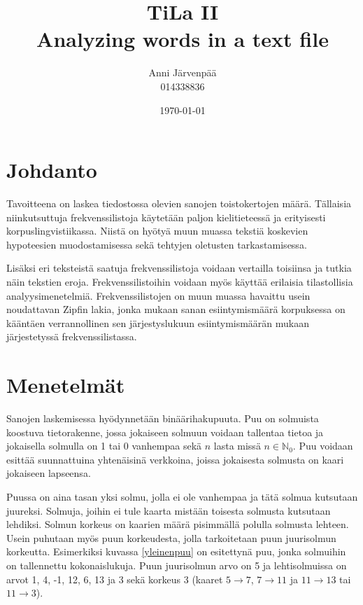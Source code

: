 \documentclass[12pt,a4paper,titlepage]{article}
\title{TiLa II \\ Analyzing words in a text file \vspace{0.5em}}
\author{\begin{tabular}{c}
Anni Järvenpää \\ 014338836
\end{tabular}}
\date{\today}
\begin{document}
\maketitle

\newpage
\null
\thispagestyle{empty}
\addtocounter{page}{-1}
\newpage

\section{Johdanto}
Tavoitteena on laskea tiedostossa olevien sanojen toistokertojen määrä. Tällaisia niinkutsuttuja frekvenssilistoja käytetään paljon kielitieteessä ja erityisesti korpuslingvistiikassa. Niistä on hyötyä muun muassa tekstiä koskevien hypoteesien muodostamisessa sekä tehtyjen oletusten tarkastamisessa. \cite{kilitiede} %

Lisäksi eri teksteistä saatuja frekvenssilistoja voidaan vertailla toisiinsa ja tutkia näin tekstien eroja. Frekvenssilistoihin voidaan myös käyttää erilaisia tilastollisia analyysimenetelmiä. Frekvenssilistojen on muun muassa havaittu usein noudattavan Zipfin lakia, jonka mukaan sanan esiintymismäärä korpuksessa on kääntäen verrannollinen sen järjestyslukuun esiintymismäärän mukaan järjestetyssä frekvenssilistassa. \cite{kilitiede, wikizipf}

\section{Menetelmät}
Sanojen laskemisessa hyödynnetään binäärihakupuuta. Puu on solmuista koostuva tietorakenne, jossa jokaiseen solmuun voidaan tallentaa tietoa ja jokaisella solmulla on 1 tai 0 vanhempaa sekä $n$ lasta missä $n \in \mathbb{N}_0$. Puu voidaan esittää suunnattuina yhtenäisinä verkkoina, joissa jokaisesta solmusta on kaari jokaiseen lapseensa. \cite{cormen}

Puussa on aina tasan yksi solmu, jolla ei ole vanhempaa ja tätä solmua kutsutaan juureksi. Solmuja, joihin ei tule kaarta mistään toisesta solmusta kutsutaan lehdiksi. Solmun korkeus on kaarien määrä pisimmällä polulla solmusta lehteen. Usein puhutaan myös puun korkeudesta, jolla tarkoitetaan puun juurisolmun korkeutta. Esimerkiksi kuvassa \ref{yleinenpuu} on esitettynä puu, jonka solmuihin on tallennettu kokonaislukuja. Puun juurisolmun arvo on 5 ja lehtisolmuissa on arvot 1, 4, -1, 12, 6, 13 ja 3 sekä korkeus 3 (kaaret $5 \rightarrow 7$, $7 \rightarrow 11$ ja $11 \rightarrow 13$ tai $11 \rightarrow 3$). \cite{cormen}
\end{document}
